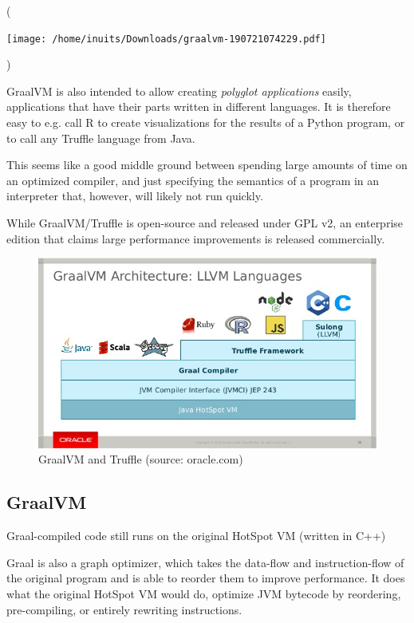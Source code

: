 \documentclass[english,zadani,odsaz]{fitthesis}
\begin{document}
(\begin{center}
\texttt{[image: /home/inuits/Downloads/graalvm-190721074229.pdf]}
\end{center})


GraalVM is also intended to allow creating \emph{polyglot applications} easily,
applications that have their parts written in different languages. It is
therefore easy to e.g. call R to create visualizations for the results of a
Python program, or to call any Truffle language from Java.

This seems like a good middle ground between spending large amounts of time on
an optimized compiler, and just specifying the semantics of a program in an
interpreter that, however, will likely not run quickly.

While GraalVM/Truffle is open-source and released under GPL v2, an
enterprise edition that claims large performance improvements is released
commercially.

\begin{figure}[!htb]
\centering
\includegraphics[width=.9\linewidth]{./img/graalvm.jpg}
\caption{GraalVM and Truffle (source: oracle.com)}
\end{figure}

\subsection{GraalVM}
\label{sec:org3ecd155}
Graal-compiled code still runs on the original HotSpot VM (written in C++)

Graal is also a graph optimizer, which takes the data-flow and instruction-flow
of the original program and is able to reorder them to improve performance. It
does what the original HotSpot VM would do, optimize JVM bytecode by reordering,
pre-compiling, or entirely rewriting instructions.
\end{document}
